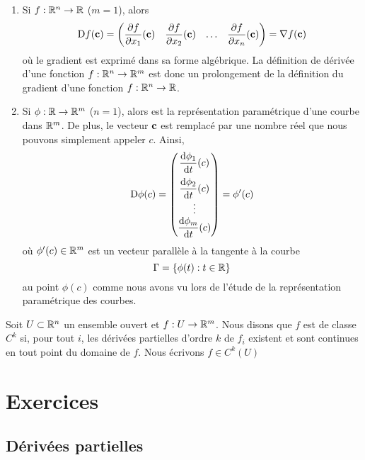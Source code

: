 {\begin{rmkList}
\begin{enumerate}
\item Si $f:\mathbb{R}^n\rightarrow \mathbb{R}$ ($m=1$), alors
\[
\mathrm{D} f(\mathbf{c}) =
\begin{pmatrix}
\displaystyle \frac{\partial f}{\partial x_1}(\mathbf{c}) &
\displaystyle \frac{\partial f}{\partial x_2}(\mathbf{c}) & \ldots &
\displaystyle \frac{\partial f}{\partial x_n}(\mathbf{c})
\end{pmatrix}
= \nabla f(\mathbf{c})
\]
où le gradient est exprimé dans sa forme algébrique.
La définition de dérivée d'une fonction $f:\mathbb{R}^n\rightarrow \mathbb{R}^m$ est
donc un prolongement de la définition du gradient d'une fonction
$f:\mathbb{R}^n\rightarrow \mathbb{R}$.
\item Si $\phi:\mathbb{R}\rightarrow \mathbb{R}^m$ ($n=1$), alors
est la représentation paramétrique d'une courbe dans $\mathbb{R}^m$.  De
plus, le vecteur $\mathbf{c}$ est remplacé par une nombre réel que nous pouvons
simplement appeler $c$.  Ainsi,
\[
\mathrm{D} \phi(c) =
\begin{pmatrix}
\displaystyle \frac{\mathrm{d}\phi_1}{\mathrm{d}t}(c) \\[2ex]
\displaystyle \frac{\mathrm{d}\phi_2}{\mathrm{d}t}(c) \\ \vdots \\
\displaystyle \frac{\mathrm{d}\phi_m}{\mathrm{d}t}(c)
\end{pmatrix}
= \phi'(c)
\]
où $\phi'(c) \in \mathbb{R}^m$ est un vecteur parallèle à la tangente à la
courbe
\[
\Gamma = \{ \phi(t) : t \in \mathbb{R} \}
\]
au point $\phi(c)$ comme nous avons vu lors de l'étude de la représentation
paramétrique des courbes.
\end{enumerate}
\end{rmkList}

\begin{defn} 
Soit $U \subset \mathbb{R}^n$ un ensemble ouvert et $f:U \rightarrow \mathbb{R}^m$.
Nous disons que $f$ est de classe $C^k$ si, pour tout $i$, les dérivées
partielles d'ordre $k$ de $f_i$ existent et sont continues en tout
point du domaine de $f$.  Nous écrivons $f \in C^k(U)$
\end{defn}

}  %

\section{Exercices}

\subsection{Dérivées partielles}

